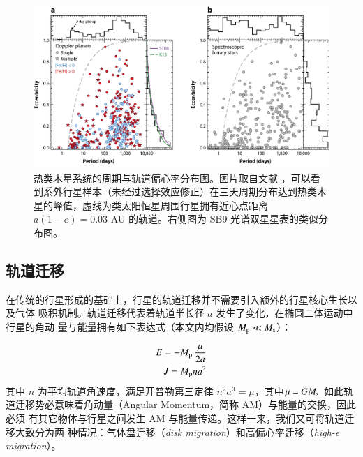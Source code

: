 \begin{figure}[t]
\centering
\includegraphics[width=1.0\textwidth]{figures/chapter4/fig3_peccdist.jpeg}
\caption[热类木星系统的周期与轨道偏心率分布图。可以看到系外行星样本（未经过选择效应修正）在三天周期分布达到热类木星的峰值，虚线为类太阳恒星周围行星拥有近心点距离 $a(1-e) = 0.03$ AU 的轨道。右侧图为 SB9 光谱双星星表的类似分布图，图片取自 Winn 和 Fabrycky。]{热类木星系统的周期与轨道偏心率分布图。图片取自文献 ，可以看到系外行星样本（未经过选择效应修正）在三天周期分布达到热类木星的峰值，虚线为类太阳恒星周围行星拥有近心点距离 $a(1-e) = 0.03$ AU 的轨道。右侧图为 SB9 光谱双星星表的类似分布图。}
\label{fig:hjperecc}
\end{figure}


\subsection{轨道迁移} \label{sec:migration}

在传统的行星形成的基础上，行星的轨道迁移并不需要引入额外的行星核心生长以及气体
吸积机制。轨道迁移代表着轨道半长径 $a$ 发生了变化，在椭圆二体运动中行星的角动
量与能量拥有如下表达式（本文内均假设 $M_\mathrm{p} \ll M_\mathrm{s}$）：

\begin{eqnarray}
E = - M_\mathrm{p} \, \frac{\mu}{2a} \\ \label{eq:2be}
J = M_\mathrm{p} n a^2 \label{eq:2bam}
\end{eqnarray} %
其中 $n$ 为平均轨道角速度，满足开普勒第三定律 $n^2a^3=\mu$，其中$\mu = G M_\mathrm{s}$
如此轨道迁移势必意味着角动量（Angular Momentum，简称 AM）与能量的交换，因此必须
有其它物体与行星之间发生 AM 与能量传递。这样一来，我们又可将轨道迁移大致分为两
种情况：气体盘迁移（\textit{disk migration}）和高偏心率迁移（\textit{high-e migration}）。

